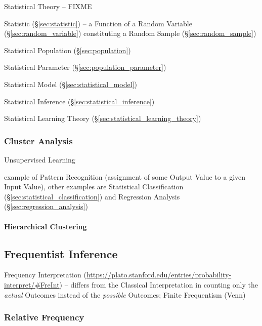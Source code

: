 
Statistical Theory -- FIXME

Statistic (\S\ref{sec:statistic}) -- a Function of a Random Variable
(\S\ref{sec:random_variable}) constituting a Random Sample
(\S\ref{sec:random_sample})

Statistical Population (\S\ref{sec:population})

Statistical Parameter (\S\ref{sec:population_parameter})

Statistical Model (\S\ref{sec:statistical_model})

Statistical Inference (\S\ref{sec:statistical_inference})

Statistical Learning Theory (\S\ref{sec:statistical_learning_theory})



\subsubsection{Cluster Analysis}\label{sec:cluster_analysis}

Unsupervised Learning

example of Pattern Recognition (assignment of some Output Value to a given Input
Value), other examples are Statistical Classification
(\S\ref{sec:statistical_classification}) and Regression Analysis
(\S\ref{sec:regression_analysis})



\paragraph{Hierarchical Clustering}\label{sec:hierarchical_clustering}\hfill



\subsection{Frequentist Inference}\label{sec:frequentist_inference}

Frequency Interpretation
(\url{https://plato.stanford.edu/entries/probability-interpret/#FreInt}) --
differs from the Classical Interpretation in counting only the \emph{actual}
Outcomes instead of the \emph{possible} Outcomes; Finite Frequentism (Venn)



\subsubsection{Relative Frequency}\label{sec:relative_frequency}

